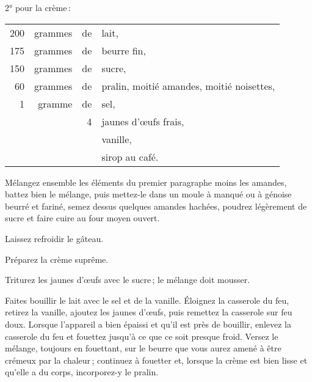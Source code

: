 \medskip

2° pour la crème :

\footnotesize
\begin{longtable}{rrrp{16em}}
    200 & grammes & de & lait,                                                                            \\
    175 & grammes & de & beurre fin,                                                                      \\
    150 & grammes & de & sucre,                                                                           \\
     60 & grammes & de & pralin, moitié amandes, moitié noisettes,                                        \\
      1 & gramme  & de & sel,                                                                             \\
        &         &  4 & jaunes d'œufs frais,                                                             \\
        &         &    & vanille,                                                                         \\
        &         &    & sirop au café.                                                                   \\
\end{longtable}
\normalsize

Mélangez ensemble les éléments du premier paragraphe moins les amandes,
battez bien le mélange, puis mettez-le dans un moule à manqué ou à génoise
beurré et fariné, semez dessus quelques amandes hachées, poudrez légèrement de
sucre et faire cuire au four moyen ouvert.

Laissez refroidir le gâteau.

Préparez la crème suprême.

Triturez les jaunes d'œufs avec le sucre ; le mélange doit mousser.

Faites bouillir le lait avec le sel et de la vanille. Éloignez la casserole du
feu, retirez la vanille, ajoutez les jaunes d'œufs, puis remettez la casserole
sur feu doux. Lorsque l'appareil a bien épaissi et qu'il est près de bouillir,
enlevez la casserole du feu et fouettez jusqu'à ce que ce soit presque froid.
Versez le mélange, toujours en fouettant, sur le beurre que vous aurez amené
à être crémeux par la chaleur ; continuez à fouetter et, lorsque la crème est
bien lisse et qu'elle a du corps, incorporez-y le pralin.

